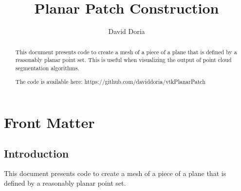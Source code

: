 \documentclass{ComputationalAlgorithmsArticle}
\title{Planar Patch Construction}
\author{David Doria}
\newcommand{\IJhandlerIDnumber}{3303}
\begin{document}
\IJhandlefooter{\IJhandlerIDnumber}


\ifpdf
\else
\fi


\maketitle


\ifhtml
\chapter*{Front Matter\label{front}}
\fi

\begin{abstract}
\noindent

This document presents code to create a mesh of a piece of a plane that is defined by a reasonably planar point set. This is useful when visualizing the output of point cloud segmentation algorithms.

The code is available here:
https://github.com/daviddoria/vtkPlanarPatch

\end{abstract}

\IJhandlenote{\IJhandlerIDnumber}

\tableofcontents
\section{Introduction}
This document presents code to create a mesh of a piece of a plane that is defined by a reasonably planar point set.
\end{document}
